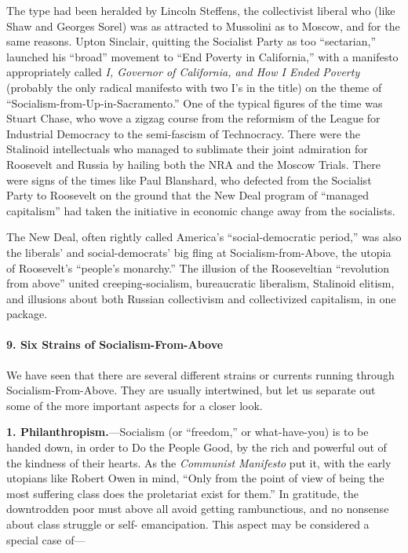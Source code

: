 The type had been heralded by Lincoln Steffens, the collectivist liberal who (like Shaw and Georges Sorel) was as attracted to Mussolini as to Moscow, and for the same reasons. Upton Sinclair, quitting the Socialist Party as too ``sectarian,'' launched his ``broad'' movement to ``End Poverty in California,'' with a manifesto appropriately called \emph{I, Governor of California, and How I Ended Poverty} (probably the only radical manifesto with two I's in the title) on the theme of ``Socialism-from-Up-in-Sacramento.'' One of the typical figures of the time was Stuart Chase, who wove a zigzag course from the reformism of the League for Industrial Democracy to the semi-fascism of Technocracy. There were the Stalinoid intellectuals who managed to sublimate their joint admiration for Roosevelt and Russia by hailing both the NRA and the Moscow Trials. There were signs of the times like Paul Blanshard, who defected from the Socialist Party to Roosevelt on the ground that the New Deal program of ``managed capitalism'' had taken the initiative in economic change away from the socialists.

The New Deal, often rightly called America's ``social-democratic period,'' was also the liberals' and social-democrats' big fling at Socialism-from-Above, the utopia of Roosevelt's ``people's monarchy.'' The illusion of the Rooseveltian ``revolution from above'' united creeping-socialism, bureaucratic liberalism, Stalinoid elitism, and illusions about both Russian collectivism and collectivized capitalism, in one package.

\paragraph{9. Six Strains of Socialism-From-Above}

We have seen that there are several different strains or currents running through Socialism-From-Above. They are usually intertwined, but let us separate out some of the more important aspects for a closer look.

\textbf{1. Philanthropism.}---Socialism (or ``freedom,'' or what-have-you) is to be handed down, in order to Do the People Good, by the rich and powerful out of the kindness of their hearts. As the \emph{Communist Manifesto} put it, with the early utopians like Robert Owen in mind, ``Only from the point of view of being the most suffering class does the proletariat exist for them.'' In gratitude, the downtrodden poor must above all avoid getting rambunctious, and no nonsense about class struggle or self- emancipation. This aspect may be considered a special case of---

